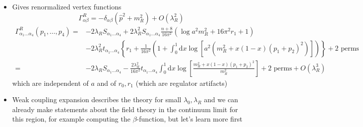 \begin{itemize}
\begin{align}
    Z^2 &\Gamma_{\alpha_1 \ldots \alpha_4}(0,0,0,0) =  \Gamma_{\alpha_1 \ldots \alpha_4}^R(0,0,0,0) = -2 \lambda_R S_{\alpha_1 \ldots \alpha_4}\\
    &= (1 + {\cal O}(\lambda_0)^2)^2\left[-2 \lambda_0 S_{\alpha_1 \ldots \alpha_4} - 2 \lambda_0^2\left(t_{\alpha_1 \alpha_2 \alpha_3 \alpha_4} + t_{\alpha_1 \alpha_3 \alpha_2 \alpha_4} + t_{\alpha_1 \alpha_4 \alpha_2 \alpha_3}\right)\left(r_1 + \frac{1}{16 \pi^2}\left(1 + \log(a^2 m_0^2)\right)\right)\right]\\
    &\Rightarrow \lambda_R = \lambda_0 + \lambda_0^2 \frac{(n+8)}{16 \pi^2}(\log(a^2 m_0^2) + 16 \pi^2 r_1 + 1) + O(\lambda_0^3)\\
    &\Rightarrow \lambda_0 = \lambda_R - \lambda_R^2 \frac{n+8}{16 \pi^2}(\log(a^2 m_R^2) + 16 \pi^2 r_1 + 1)+ O(\lambda_R^3)
\end{align}
using $\left(t_{\alpha_1 \alpha_2 \alpha_3 \alpha_4} + t_{\alpha_1 \alpha_3 \alpha_2 \alpha_4} + t_{\alpha_1 \alpha_4 \alpha_2 \alpha_3}\right)=(n+8) S_{\alpha_1\alpha_2\alpha_3\alpha_4}$.
\item Gives renormalized vertex functions
\begin{equation}
    \Gamma^R_{\alpha \beta} = -\delta_{\alpha \beta}(\hat p^2 + m^2_R) + O(\lambda_R^2)
\end{equation}
\begin{align}
    \Gamma^R_{\alpha_1 \ldots \alpha_4}(p_1, \ldots, p_4) =& -2 \lambda_R S_{\alpha_1 \ldots \alpha_4} + 2 \lambda_R^2 S_{\alpha_1 \ldots \alpha_4}\frac{n+8}{16 \pi^2}(\log a^2 m_R^2 + 16 \pi^2 r_1 + 1)\\
    &-2 \lambda_R^2 t_{\alpha_1 \ldots \alpha_4}\left\{ r_1 + \frac{1}{16 \pi^2}\left(1 + \int_0^1 \text{d}x \log\left[a^2(m_R^2 + x(1-x)(p_1 + p_2)^2)\right]\right)\right\} + \text{2 perms} \\
    =& - 2 \lambda_R S_{\alpha_1 \ldots \alpha_4} - \frac{2 \lambda_R^2}{16 \pi^2}t_{\alpha_1 \ldots \alpha_4} \int_0^1 \text{d}x \log \left[ \frac{m_R^2 + x(1-x)(p_1 + p_2)^2}{m_R^2}\right] + \text{2 perms} + O(\lambda_R^3)
\end{align}
which are independent of $a$ and of $r_0, r_1$ (which are regulator artifacts)
\item Weak coupling expansion describes the theory for small $\lambda_0, \lambda_R$ and we can already make statements about the field theory in the continuum limit for this region, for example computing the $\beta$-function, but let's learn more first
\end{itemize}

